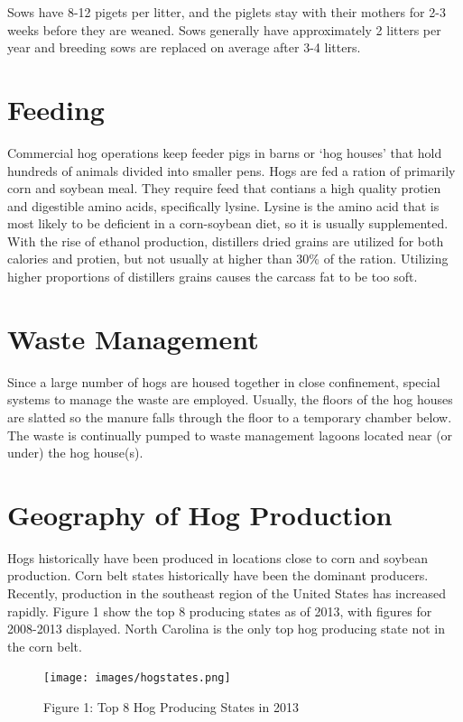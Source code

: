 \documentclass[
  letterpaper,
  DIV=11,
  numbers=noendperiod]{scrreprt}
\begin{document}
Sows have 8-12 pigets per litter, and the piglets stay with their
mothers for 2-3 weeks before they are weaned. Sows generally have
approximately 2 litters per year and breeding sows are replaced on
average after 3-4 litters.

\section{Feeding}\label{feeding}

Commercial hog operations keep feeder pigs in barns or `hog houses' that
hold hundreds of animals divided into smaller pens. Hogs are fed a
ration of primarily corn and soybean meal. They require feed that
contians a high quality protien and digestible amino acids, specifically
lysine. Lysine is the amino acid that is most likely to be deficient in
a corn-soybean diet, so it is usually supplemented. With the rise of
ethanol production, distillers dried grains are utilized for both
calories and protien, but not usually at higher than 30\% of the ration.
Utilizing higher proportions of distillers grains causes the carcass fat
to be too soft.

\section{Waste Management}\label{waste-management}

Since a large number of hogs are housed together in close confinement,
special systems to manage the waste are employed. Usually, the floors of
the hog houses are slatted so the manure falls through the floor to a
temporary chamber below. The waste is continually pumped to waste
management lagoons located near (or under) the hog house(s).

\section{Geography of Hog Production}\label{geography-of-hog-production}

Hogs historically have been produced in locations close to corn and
soybean production. Corn belt states historically have been the dominant
producers. Recently, production in the southeast region of the United
States has increased rapidly. Figure 1 show the top 8 producing states
as of 2013, with figures for 2008-2013 displayed. North Carolina is the
only top hog producing state not in the corn belt.

\begin{figure}[H]

{\centering \texttt{[image: images/hogstates.png]}

}

\caption{Figure 1: Top 8 Hog Producing States in 2013}

\end{figure}%
\end{document}
